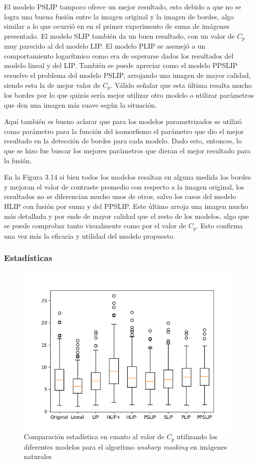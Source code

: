 El modelo PSLIP tampoco ofrece un mejor resultado, esto debido a que no se logra una buena fusi\'on entre la imagen original y la imagen de bordes, algo similar a lo que ocurri\'o en en el primer experimento de suma de im\'agenes presentado. El modelo SLIP tambi\'en da un buen resultado, con un valor de $C_p$ muy parecido al del modelo LIP. El modelo PLIP se asemej\'o a un comportamiento logar\'itmico como era de esperarse dados los resultados del modelo lineal y del LIP. Tambi\'en se puede apreciar como el modelo PPSLIP resuelve el problema del modelo PSLIP, arrojando una imagen de mayor calidad, siendo esta la de mejor valor de $C_p$. V\'alido se\~nalar que esta \'ultima resalta mucho los bordes por lo que quiz\'as ser\'ia mejor utilizar otro modelo o utilizar par\'ametros que den una imagen m\'as suave seg\'un la situaci\'on.

Aqu\'i tambi\'en es bueno aclarar que para los modelos parametrizados se utiliz\'o como par\'ametro para la funci\'on del isomorfismo el par\'ametro que dio el mejor resultado en la detecci\'on de bordes para cada modelo. Dado esto, entonces, lo que se hizo fue buscar los mejores par\'ametros que dieran el mejor resultado para la fusi\'on.

En la Figura 3.14 si bien todos los modelos resaltan en alguna medida los bordes y mejoran el valor de contraste promedio con respecto a la imagen original, los resultados no se diferencian mucho unos de otros, salvo los casos del modelo HLIP con fusi\'on por suma y del PPSLIP. Este \'ultimo arroja una imagen mucho m\'as detallada y por ende de mayor calidad que el resto de los modelos, algo que se puede comprobar tanto visualmente como por el valor de $C_p$. Esto confirma una vez m\'as la eficacia y utilidad del modelo propuesto.

\subsubsection{Estad\'isticas}

\begin{figure}
	\begin{center}
		\includegraphics[width=10.0 cm]{images/graphics/natural/unsharp_masking/um_all.png}
		\caption{Comparaci\'on estad\'istica en cuanto al valor de $C_p$ utilizando los diferentes modelos para el algoritmo \textit{unsharp masking} en im\'agenes naturales}
	\end{center}
\end{figure}


